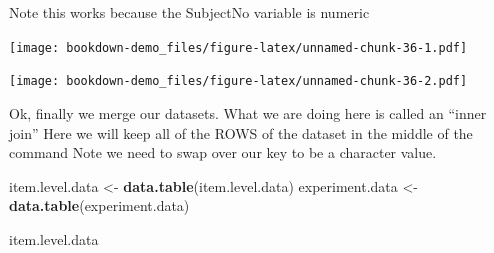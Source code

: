 \documentclass[]{book}
\newenvironment{Shaded}{\begin{snugshade}}{\end{snugshade}}
\newcommand{\KeywordTok}[1]{\textcolor[rgb]{0.13,0.29,0.53}{\textbf{#1}}}
\newcommand{\StringTok}[1]{\textcolor[rgb]{0.31,0.60,0.02}{#1}}
\newcommand{\OperatorTok}[1]{\textcolor[rgb]{0.81,0.36,0.00}{\textbf{#1}}}
\newcommand{\NormalTok}[1]{#1}
\theoremstyle{definition}
\theoremstyle{definition}
\theoremstyle{definition}
\theoremstyle{remark}
\begin{document}
Note this works because the SubjectNo variable is numeric

\begin{Shaded}
\end{Shaded}

\texttt{[image: bookdown-demo\_files/figure-latex/unnamed-chunk-36-1.pdf]}

\begin{Shaded}
\end{Shaded}

\texttt{[image: bookdown-demo\_files/figure-latex/unnamed-chunk-36-2.pdf]}

Ok, finally we merge our datasets. What we are doing here is called an
``inner join'' Here we will keep all of the ROWS of the dataset in the
middle of the command Note we need to swap over our key to be a
character value.

\begin{Shaded}
\begin{Highlighting}[]
\NormalTok{item.level.data <-}\StringTok{ }\KeywordTok{data.table}\NormalTok{(item.level.data)}
\NormalTok{experiment.data <-}\StringTok{ }\KeywordTok{data.table}\NormalTok{(experiment.data)}

\NormalTok{item.level.data}
\end{Highlighting}
\end{Shaded}
\end{document}

